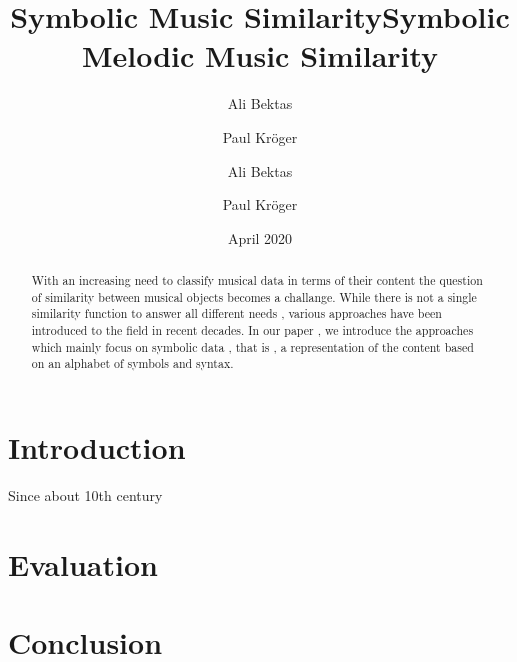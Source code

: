 \documentclass{llncs}
\title{Symbolic Music Similarity}
\author{Ali Bektas \and Paul Kröger}
\date{April 2020}
\begin{document}
	
	\frontmatter  

	\tableofcontents

	\mainmatter
	\title{Symbolic Melodic Music Similarity}
	\author{Ali Bektas \and Paul Kröger}
	\maketitle


	\begin{abstract}
	With an increasing need to classify musical data in terms of their content 
	the question of similarity between musical objects becomes a challange. While 
	there is not a single similarity function to answer all different needs , various approaches
	have been introduced to the field in recent decades. In our paper , we introduce the approaches
	which mainly focus on symbolic data , that is , a representation of the content based on an alphabet
	of symbols and syntax.
	\end{abstract}

	\section{Introduction}
        Since about 10th century 

	\section{}
	
	\section{Evaluation}
	
	\section{Conclusion}

	
\end{document}
